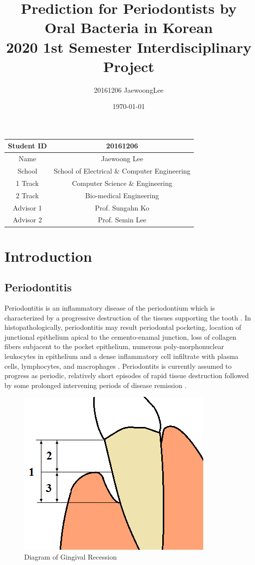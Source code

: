 \documentclass[11pt, a4paper]{article}
\title{Prediction for Periodontists by Oral Bacteria in Korean\\ \large 2020 1st Semester Interdisciplinary Project}
\author{20161206 JaewoongLee}
\date{\today}
\begin{document}
    \maketitle
    \begin{table}[h]
    	\centering
		\begin{tabular}{c|c}
			Student ID & 20161206 \\ \hline
			Name & Jaewoong Lee \\ \hline
			School & School of Electrical \& Computer Engineering \\ \hline
			1 Track & Computer Science \& Engineering \\ \hline
			2 Track & Bio-medical Engineering \\ \hline
			Advisor 1 & Prof. Sungahn Ko \\ \hline
			Advisor 2 & Prof. Semin Lee \\
		\end{tabular}
    \end{table}
    \newpage
    
    \tableofcontents
    \listoftables
    \listoffigures
    \newpage
    
    \section{Introduction}
    	\subsection{Periodontitis}
    		Periodontitis is an inflammatory disease of the periodontium which is characterized by a progressive destruction of the tissues supporting the tooth \cite{ref:perio2}. In histopathologically, periodontitis may result periodontal pocketing, location of junctional epithelium apical to the cemento-enamal junction, loss of collagen fibers subjacent to the pocket epithelium, numerous poly-morphonuclear leukocytes in epithelium and a dense inflammatory cell infiltrate with plasma cells, lymphocytes, and macrophages \cite{ref:perio1}. Periodontits is currently assumed to progress as periodic, relatively short episodes of rapid tissue destruction followed by some prolonged intervening periods of disease remission \cite{ref:perio2}. 
    		
    		\begin{figure}[htbp]
    			\centering
    			\includegraphics[width=0.3 \linewidth]{figures/recession.png}
    			\caption{Diagram of Gingival Recession \protect \cite{ref:depth1}}
    			\label{fig:depth}
    		\end{figure}
    	
\end{document}
